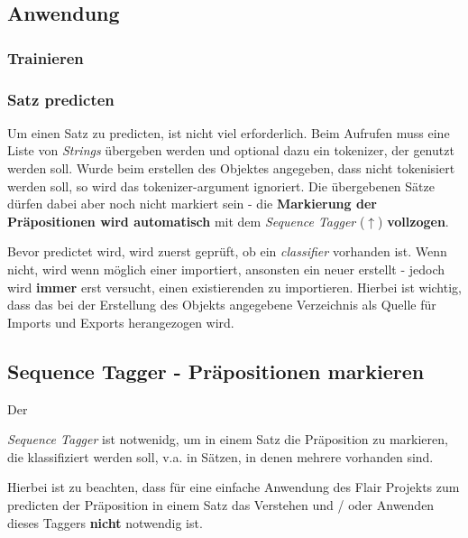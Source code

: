 \documentclass[10pt,a4paper]{article}
\begin{document}
\subsection{Anwendung}
\begin{flushleft}

\end{flushleft}

\subsubsection{Trainieren}
\begin{flushleft}

\end{flushleft}

\subsubsection{Satz predicten}
\begin{flushleft}
Um einen Satz zu predicten, ist nicht viel erforderlich. Beim Aufrufen muss eine Liste von \textit{Strings} übergeben werden und optional dazu ein tokenizer, der genutzt werden soll. Wurde beim erstellen des Objektes angegeben, dass nicht tokenisiert werden soll, so wird das tokenizer-argument ignoriert. Die übergebenen Sätze dürfen dabei aber noch nicht markiert sein - die \textbf{Markierung der Präpositionen wird automatisch} mit dem \textit{Sequence Tagger} (\hyperlink{SeqTag}{$\uparrow$}) \textbf{vollzogen}.

Bevor predictet wird, wird zuerst geprüft, ob ein \textit{classifier} vorhanden ist. Wenn nicht, wird wenn möglich einer importiert, ansonsten ein neuer erstellt - jedoch wird \textbf{immer} erst versucht, einen existierenden zu importieren. Hierbei ist wichtig, dass das bei der Erstellung des Objekts angegebene Verzeichnis als Quelle für Imports und Exports herangezogen wird. 
\end{flushleft}

\subsection{Sequence Tagger - Präpositionen markieren}
\begin{flushleft}
\hypertarget{SeqTag}{Der} \textit{Sequence Tagger} ist notwenidg, um in einem Satz die Präposition zu markieren, die klassifiziert werden soll, v.a. in Sätzen, in denen mehrere vorhanden sind.

Hierbei ist zu beachten, dass für eine einfache Anwendung des Flair Projekts zum predicten der Präposition in einem Satz das Verstehen und / oder Anwenden dieses Taggers \textbf{nicht} notwendig ist.
\end{flushleft}
\end{document}

